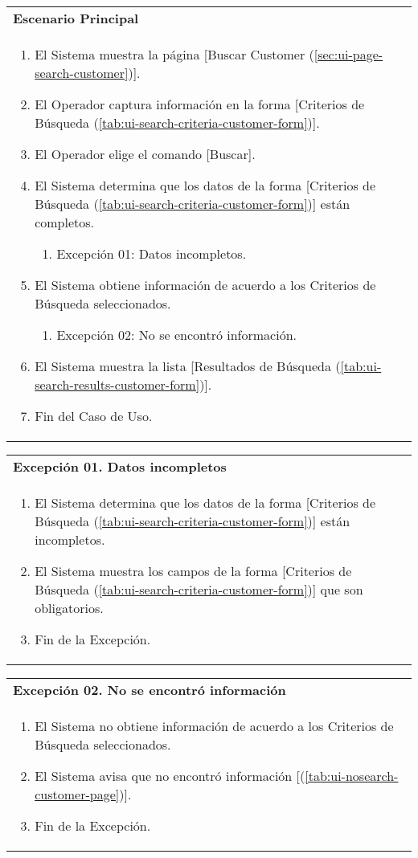 	\begin{tabular}{ p{15.5cm} }
		\textbf{Escenario Principal} \\
		\begin{enumerate}
			\item El Sistema muestra la p\'agina [Buscar Customer (\ref{sec:ui-page-search-customer})].
			\item El Operador captura informaci\'on en la forma [Criterios de B\'usqueda (\ref{tab:ui-search-criteria-customer-form})].
			\item El Operador elige el comando [Buscar].
			\item El Sistema determina que los datos de la forma [Criterios de B\'usqueda (\ref{tab:ui-search-criteria-customer-form})] est\'an completos.
				\begin{enumerate}
					\item Excepci\'on 01: Datos incompletos.
				\end{enumerate}
			\item El Sistema obtiene informaci\'on de acuerdo a los Criterios de B\'usqueda seleccionados.
				\begin{enumerate}
					\item Excepci\'on 02: No se encontr\'o informaci\'on.
				\end{enumerate}
			\item El Sistema muestra la lista [Resultados de B\'usqueda (\ref{tab:ui-search-results-customer-form})].
			\item Fin del Caso de Uso.
		\end{enumerate}
	\end{tabular}
	
	\begin{tabular}{ p{15.5cm} }
		\textbf{Excepci\'on 01. Datos incompletos} \\
		\begin{enumerate}
			\item El Sistema determina que los datos de la forma [Criterios de B\'usqueda (\ref{tab:ui-search-criteria-customer-form})] est\'an incompletos.
			\item El Sistema muestra los campos de la forma [Criterios de B\'usqueda (\ref{tab:ui-search-criteria-customer-form})] que son obligatorios.
			\item Fin de la Excepci\'on.
		\end{enumerate}
	\end{tabular}
	
	\begin{tabular}{ p{15.5cm} }
		\textbf{Excepci\'on 02. No se encontr\'o informaci\'on} \\
		\begin{enumerate}
			\item El Sistema no obtiene informaci\'on de acuerdo a los Criterios de B\'usqueda seleccionados.
			\item El Sistema avisa que no encontr\'o informaci\'on [(\ref{tab:ui-nosearch-customer-page})].
			\item Fin de la Excepci\'on.
		\end{enumerate}
	\end{tabular}
	
